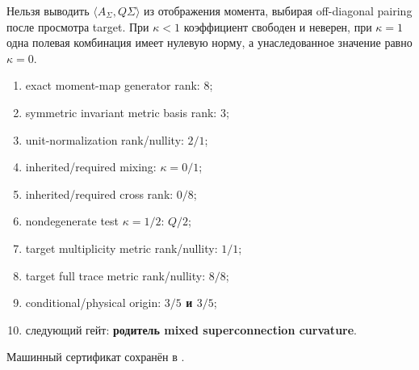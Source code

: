 \begin{nogocriterion}
Нельзя выводить $\langle A_\Sigma,Q\Sigma\rangle$ из отображения момента,
выбирая off-diagonal pairing после просмотра target. При $\kappa<1$
коэффициент свободен и неверен, при $\kappa=1$ одна полевая комбинация
имеет нулевую норму, а унаследованное значение равно $\kappa=0$.
\end{nogocriterion}

\begin{protocol}\begin{enumerate}
\item exact moment-map generator rank: \textbf{$8$};
\item symmetric invariant metric basis rank: \textbf{$3$};
\item unit-normalization rank/nullity: \textbf{$2/1$};
\item inherited/required mixing: \textbf{$\kappa=0/1$};
\item inherited/required cross rank: \textbf{$0/8$};
\item nondegenerate test $\kappa=1/2$: \textbf{$Q/2$};
\item target multiplicity metric rank/nullity: \textbf{$1/1$};
\item target full trace metric rank/nullity: \textbf{$8/8$};
\item conditional/physical origin: \textbf{$3/5$ и $3/5$};
\item следующий гейт: \textbf{родитель mixed superconnection curvature}.
\end{enumerate}\end{protocol}

Машинный сертификат сохранён в
.